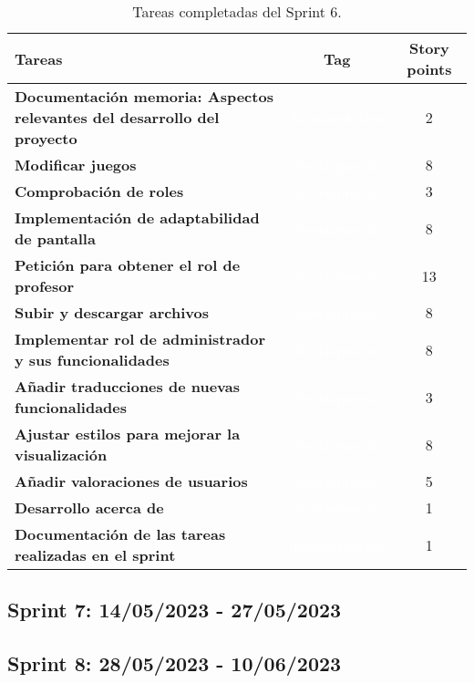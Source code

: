 \begin{table}[ht!]
    \centering
    \resizebox{15cm}{!} {
    \begin{tabular}{|l|c|c|}
    \hline
    \rowcolor[rgb]{0.99,0.93,0.93}
    \textbf{Tareas}     &\textbf{Tag}     & \textbf{Story points} \\ \hline
    \textbf{Documentación memoria: Aspectos relevantes del desarrollo del proyecto}          &\cellcolor[rgb]{0.0,0.33,0.71}\textcolor{white}{documentation}      &2 \\ \hline 
    \textbf{Modificar juegos}         &\cellcolor[rgb]{0.99,0.83,0.93}\textcolor{white}{development}      &8 \\ \hline
     \textbf{Comprobación de roles}         &\cellcolor[rgb]{0.99,0.83,0.93}\textcolor{white}{development}      &3 \\ \hline 
    \textbf{Implementación de adaptabilidad de pantalla}         &\cellcolor[rgb]{0.99,0.83,0.93}\textcolor{white}{development}      &8 \\ \hline 
    \textbf{Petición para obtener el rol de profesor}         &\cellcolor[rgb]{0.99,0.83,0.93}\textcolor{white}{development}      &13 \\ \hline 
    \textbf{Subir y descargar archivos}         &\cellcolor[rgb]{0.99,0.83,0.93}\textcolor{white}{development}      &8 \\ \hline 
    \textbf{Implementar rol de administrador y sus funcionalidades}         &\cellcolor[rgb]{0.99,0.83,0.93}\textcolor{white}{development}      &8 \\ \hline 
    \textbf{Añadir traducciones de nuevas funcionalidades}         &\cellcolor[rgb]{0.99,0.83,0.93}\textcolor{white}{development}      &3 \\ \hline 
    \textbf{Ajustar estilos para mejorar la visualización}         &\cellcolor[rgb]{0.99,0.83,0.93}\textcolor{white}{development}      &8 \\ \hline 
    \textbf{Añadir valoraciones de usuarios}         &\cellcolor[rgb]{0.99,0.83,0.93}\textcolor{white}{development}      &5 \\ \hline 
    \textbf{Desarrollo acerca de}         &\cellcolor[rgb]{0.99,0.83,0.93}\textcolor{white}{development}      &1 \\ \hline 
    \textbf{Documentación de las tareas realizadas en el sprint}         &\cellcolor[rgb]{0.0,0.33,0.71}\textcolor{white}{documentation}      &1 \\ \hline 
    \end{tabular}}
    \caption{Tareas completadas del Sprint 6.}
    \label{tab:my_label}
\end{table}

\subsection{Sprint 7: 14/05/2023 - 27/05/2023}
\subsection{Sprint 8: 28/05/2023 - 10/06/2023}

